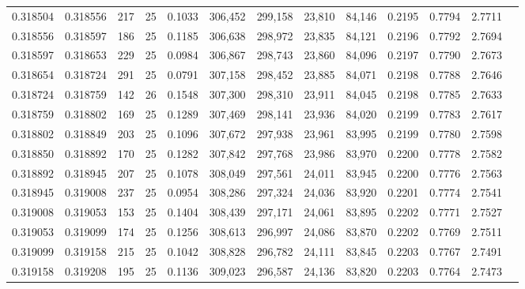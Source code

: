 \begin{tabular}{rrrrrrrrrrrrr}
0.318504 & 0.318556 &   217 &  25 &                                     0.1033 & 306,452 & 299,158 &  23,810 &  84,146 & 0.2195 & 0.7794 & 2.7711 \\
0.318556 & 0.318597 &   186 &  25 &                                     0.1185 & 306,638 & 298,972 &  23,835 &  84,121 & 0.2196 & 0.7792 & 2.7694 \\
0.318597 & 0.318653 &   229 &  25 &                                     0.0984 & 306,867 & 298,743 &  23,860 &  84,096 & 0.2197 & 0.7790 & 2.7673 \\
0.318654 & 0.318724 &   291 &  25 &                                     0.0791 & 307,158 & 298,452 &  23,885 &  84,071 & 0.2198 & 0.7788 & 2.7646 \\
0.318724 & 0.318759 &   142 &  26 &                                     0.1548 & 307,300 & 298,310 &  23,911 &  84,045 & 0.2198 & 0.7785 & 2.7633 \\
0.318759 & 0.318802 &   169 &  25 &                                     0.1289 & 307,469 & 298,141 &  23,936 &  84,020 & 0.2199 & 0.7783 & 2.7617 \\
0.318802 & 0.318849 &   203 &  25 &                                     0.1096 & 307,672 & 297,938 &  23,961 &  83,995 & 0.2199 & 0.7780 & 2.7598 \\
0.318850 & 0.318892 &   170 &  25 &                                     0.1282 & 307,842 & 297,768 &  23,986 &  83,970 & 0.2200 & 0.7778 & 2.7582 \\
0.318892 & 0.318945 &   207 &  25 &                                     0.1078 & 308,049 & 297,561 &  24,011 &  83,945 & 0.2200 & 0.7776 & 2.7563 \\
0.318945 & 0.319008 &   237 &  25 &                                     0.0954 & 308,286 & 297,324 &  24,036 &  83,920 & 0.2201 & 0.7774 & 2.7541 \\
0.319008 & 0.319053 &   153 &  25 &                                     0.1404 & 308,439 & 297,171 &  24,061 &  83,895 & 0.2202 & 0.7771 & 2.7527 \\
0.319053 & 0.319099 &   174 &  25 &                                     0.1256 & 308,613 & 296,997 &  24,086 &  83,870 & 0.2202 & 0.7769 & 2.7511 \\
0.319099 & 0.319158 &   215 &  25 &                                     0.1042 & 308,828 & 296,782 &  24,111 &  83,845 & 0.2203 & 0.7767 & 2.7491 \\
0.319158 & 0.319208 &   195 &  25 &                                     0.1136 & 309,023 & 296,587 &  24,136 &  83,820 & 0.2203 & 0.7764 & 2.7473 \\

\end{tabular}
